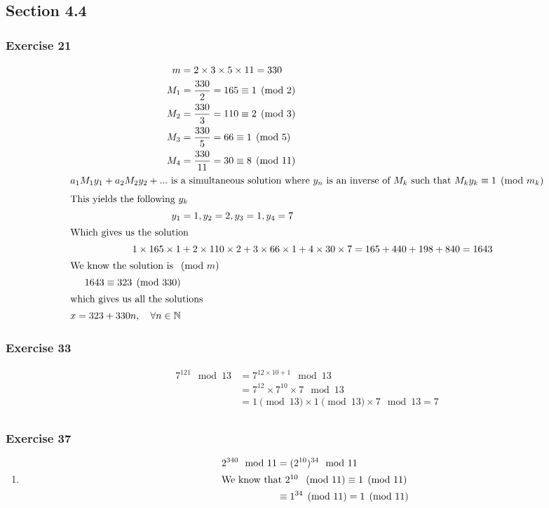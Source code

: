 \documentclass[a4paper]{article}
\newcommand{\ex}[1]{\subsubsection*{#1}}
\begin{document}
\pagestyle{fancy} %



\subsection*{Section 4.4}
\ex{Exercise 21}

\begin{align}
    m &= 2 \times 3 \times 5 \times 11 = 330 \\
    M_1 &= \frac{330}{2} = 165 \equiv 1 \pmod 2 \\
    M_2 &= \frac{330}{3} = 110 \equiv 2 \pmod 3 \\
    M_3 &= \frac{330}{5} = 66 \equiv 1 \pmod 5 \\
    M_4 &= \frac{330}{11} = 30 \equiv 8\pmod{11}\\
    \intertext{\(a_1M_1y_1 + a_2M_2y_2 + ...\) is a simultaneous solution where
        \(y_n\) is an inverse of \(M_k\) such that \(M_ky_k \equiv 1 \pmod {m_k}\)}
    \intertext{This yields the following \(y_k\)}
    y_1 &= 1, y_2 = 2, y_3 = 1, y_4 = 7 \\
    \intertext{Which gives us the solution}
    1\times 165 \times 1 &+ 2\times 110 \times 2 + 3 \times 66 \times 1
        + 4 \times 30 \times 7 = 165 + 440 + 198 + 840 = 1643 \\
    \intertext{We know the solution is \(\pmod{m}\)}
    1643 \equiv 323 \pmod{330} \\
    \intertext{which gives us all the solutions}
    x = 323 + 330n, \quad \forall n \in \mathbb{N}
\end{align}


\ex{Exercise 33}

\begin{align}
    7^{121} \mod 13 &= 7^{12 \times 10 + 1} \mod 13  \\
    &= 7^{12}\times 7^{10} \times 7 \mod 13 \\
    &= 1 \pmod{13} \times 1 \pmod{13} \times 7 \mod 13 = 7\\
\end{align}


\ex{Exercise 37} %

\begin{enumerate}[label=\alph*)] 
    \item 
        \begin{align}
            2^{340} \mod 11 &= (2^{10})^{34} \mod 11 \\
            \intertext{We know that \(2^{10}\ \pmod{11} \equiv 1 \pmod {11}\)} 
            &\equiv 1^{34} \pmod {11} = 1 \pmod {11}\\
        \end{align}
\end{enumerate}
\end{document}
